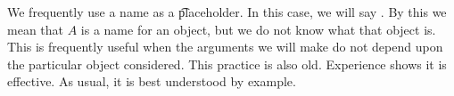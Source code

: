 %
%
%
%
%
%
%
%
%
%
%
%
%
%
%
%

%
%
%
%
%
%
%


We frequently use a name as a \t{placeholder}.
In this case, we will say .
By this we mean that $A$ is a name for an object, but we do not know what that object is.
This is frequently useful when the arguments we will make do not depend upon the particular object considered.
This practice is also old.
Experience shows it is effective.
As usual, it is best understood by example.
